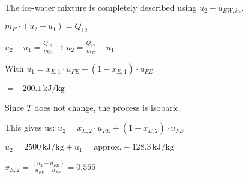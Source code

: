 The ice-water mixture is completely described using \( u_2 - u_{EW,in} \).  

\( m_E \cdot (u_2 - u_1) = Q_{12} \)  

\( u_2 - u_1 = \frac{Q_{12}}{m_E} \rightarrow u_2 = \frac{Q_{12}}{m_E} + u_1 \)  

With \( u_1 = x_{E,1} \cdot u_{FE} + (1 - x_{E,1}) \cdot u_{FE} \)  

\( = -200.1 \, \text{kJ/kg} \)  

Since \( T \) does not change, the process is isobaric.  

This gives us:  
\( u_2 = x_{E,2} \cdot u_{FE} + (1 - x_{E,2}) \cdot u_{FE} \)  

\( u_2 = 2500 \, \text{kJ/kg} + u_1 = \text{approx.} -128.3 \, \text{kJ/kg} \)  

\( x_{E,2} = \frac{(u_2 - u_{FE})}{u_{FE} - u_{FE}} = 0.555 \)